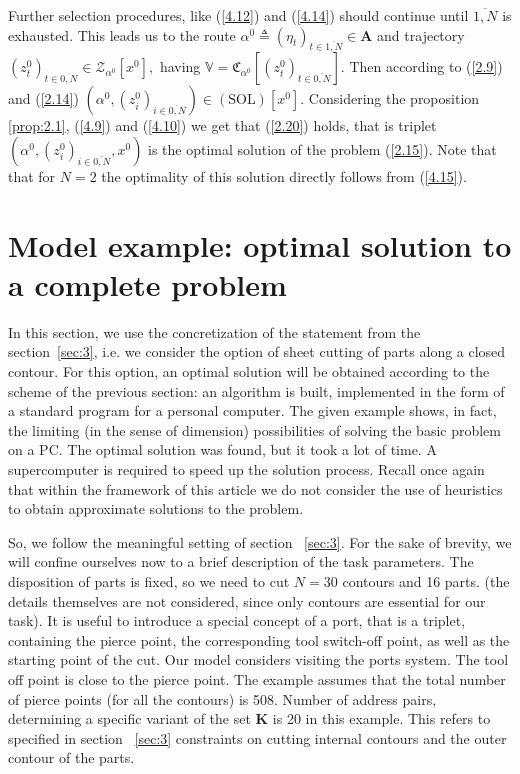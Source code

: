 \documentclass[numbers,sort&compress]{IntechOpen-Book}%
\begin{document}
Further selection procedures,
like  (\ref{4.12}) and  (\ref{4.14})
should continue until
$\overline{1, N}$ is exhausted.
This leads us to the route
$\alpha^0 {\triangleq} (\eta_t)_{t \in \overline{1,N}} \in \mathbf{A}$
and trajectory
$(z_t^0)_{t \in \overline{0,N}} \in \mathcal{Z}_{\alpha^0}[x^0],$
having
$\mathbb{V} = \mathfrak{C}_{\alpha^0}[(z_t^0)_{t \in \overline{0,N}}]$.
Then according to
 (\ref{2.9}) and  (\ref{2.14})
$(\alpha^0,(z_i^0)_{i \in \overline{0,N}}) \in (\mathrm{\mathrm{SOL}})[x^0]$.
Considering the proposition
\ref{prop:2.1},  (\ref{4.9}) and  (\ref{4.10})
we get that  (\ref{2.20}) holds,
that is triplet
$(\alpha^0,(z_i^0)_{i \in \overline{0,N}},x^0)$
is the optimal solution of the problem
 (\ref{2.15}).
Note that
that for $ N = 2 $
the optimality of this solution directly follows from
 (\ref{4.15}).

\section{Model example: optimal solution to a complete problem}
\label{sec:5}

In this section, we use the concretization of the statement
from the section~\ref{sec:3},
i.e. we consider the option of sheet cutting of parts along a closed contour.
For this option, an optimal solution will be obtained according to the scheme of the previous section:
an algorithm is built, implemented in the form of a standard program for a personal computer.
The given example shows, in fact, the limiting (in the sense of dimension) possibilities of solving the basic problem on a PC.
The optimal solution was found, but it took a lot of time.
A supercomputer is required to speed up the solution process.
Recall once again that within the framework of this article
we do not consider the use of heuristics
to obtain approximate solutions to the problem.

So, we follow the meaningful setting of section ~\ref{sec:3}.
For the sake of brevity,
we will confine ourselves now to a brief description of the task parameters.
The disposition of parts is fixed,
so we need to cut
$N = 30$
contours
and 16 parts.
(the details themselves are not considered,
since only contours are essential for our task).
It is useful to introduce a special concept of a port,
that is a triplet,
containing the pierce point,
the corresponding tool switch-off point,
as well as the starting point of the cut.
Our model considers
visiting the ports system.
The tool off point is close to the pierce point.
The example assumes that the total number of pierce points
(for all the contours)
is 508.
Number of address pairs,
determining a specific variant of the set
$\mathbf{K}$
is 20
in this example.
This refers to specified in section ~\ref{sec:3}
constraints
on  cutting internal contours
and the outer contour of the parts.
\end{document}
